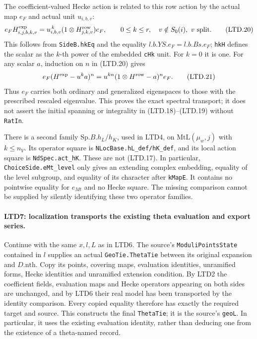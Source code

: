 The coefficient-valued Hecke action is related to this row
action by the actual map \(e_F\) and actual unit \(u_{i,b,v}\):
\[
 e_F H^{\rm exp}_{i,j,b,k,v}
       =u_{i,b,v}^{\,k}(1\otimes H^{\rm row}_{j,k,v})e_F,
       \qquad 0\le k\le r,\quad v\notin S_0(i),\ v\text{ split}.
 \tag{LTD.20}
\]
This follows from \texttt{SideB.hkEq} and the equality
\(l.b.YS.e_F=l.b.Bs.e_F\); \texttt{hkH} defines the scalar as
the \(k\)-th power of the embedded \texttt{cHk} unit.  For
\(k=0\) it is one.  For any scalar \(a\), induction on \(n\)
in (LTD.20) gives
\[
 e_F(H^{\rm exp}-u^ka)^n
       =u^{kn}(1\otimes H^{\rm row}-a)^n e_F.                    \tag{LTD.21}
\]
Thus \(e_F\) carries both ordinary and generalized eigenspaces
to those with the prescribed rescaled eigenvalue.  This proves
the exact spectral transport; it does not assert the initial
spanning or integrality in (LTD.18)--(LTD.19) without
\texttt{RatIn}.

There is a second family \(\mathrm{Sp}.B.h_L/h_K\), used in
LTD4, on \(\mathrm{MtL}(\mu_w,j)\) with \(k\le n_V\).
Its operator square is \texttt{NLocBase.hL\_def/hK\_def}, and
its local action square is \texttt{NdSpec.act\_hK}.  These
are not (LTD.17).  In particular,
\texttt{ChoiceSide.eMt\_level} only gives an extending complex
embedding, equality of the level subgroup, and equality of its
character after \texttt{kMapE}.  It contains no pointwise
equality for \(e_{Mt}\) and no Hecke square.  The missing
comparison cannot be supplied by silently identifying these
two operator families.

\paragraph{LTD7: localization transports the existing theta evaluation and export series.}
\label{claim:LTD7}
Continue with the same \(x,l,L\) as in LTD6.  The source's
\texttt{ModuliPointsState} contained in \(l\) supplies an actual
\texttt{GeoTie.ThetaTie} between its original expansion and
\(D.\mathrm{nth}\).  Copy its points, covering maps, evaluation
identities, unramified forms, Hecke identities and unramified
extension condition.  By LTD2 the coefficient fields,
evaluation maps and Hecke operators appearing on both sides
are unchanged, and by LTD6 their real model has been transported
by the identity comparison.  Every copied equality therefore
has exactly the required target and source.  This constructs
the final \texttt{ThetaTie}; it is the source's
\texttt{geoL}.  In particular, it uses the existing evaluation
identity, rather than deducing one from the existence of a
theta-named record.

